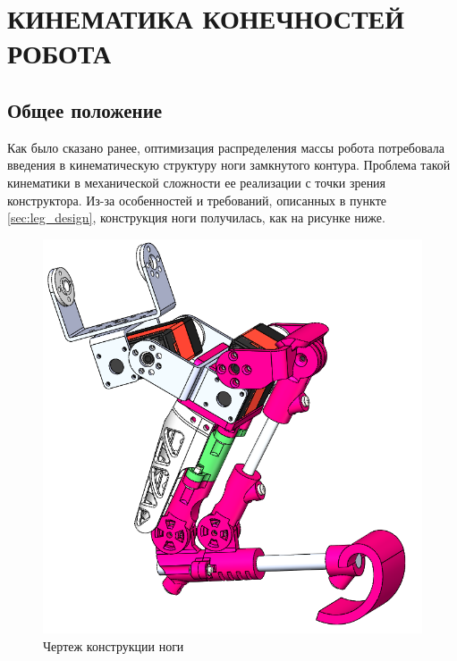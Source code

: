 \chapter{\MakeUppercase{Кинематика конечностей робота}}
\section{Общее положение} \label{sec:kin_general}
Как было сказано ранее, оптимизация распределения массы робота потребовала введения в кинематическую структуру ноги замкнутого контура.
Проблема такой кинематики в механической сложности ее реализации с точки зрения конструктора. Из-за особенностей и требований, описанных в пункте \ref{sec:leg_design}, конструкция ноги получилась, как на рисунке ниже.
\begin{figure}[h]
    \centering
    \includegraphics[scale=0.5]{chapter_kinematics/figure2.png}
    \caption{Чертеж конструкции ноги}
    \label{}
\end{figure}

